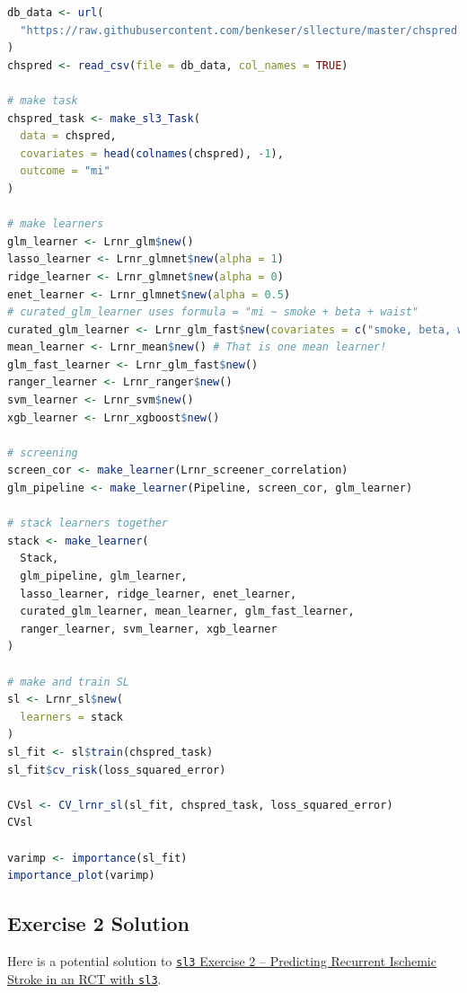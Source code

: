 \documentclass[
  12pt, krantz2,
]{krantz}
\newcommand{\passthrough}[1]{#1}
\newcommand{\1}{\mathbbm{1}}
\theoremstyle{definition}
\theoremstyle{definition}
\theoremstyle{definition}
\theoremstyle{definition}
\theoremstyle{remark}
\begin{document}
\begin{lstlisting}[language=R]
db_data <- url(
  "https://raw.githubusercontent.com/benkeser/sllecture/master/chspred.csv"
)
chspred <- read_csv(file = db_data, col_names = TRUE)

# make task
chspred_task <- make_sl3_Task(
  data = chspred,
  covariates = head(colnames(chspred), -1),
  outcome = "mi"
)

# make learners
glm_learner <- Lrnr_glm$new()
lasso_learner <- Lrnr_glmnet$new(alpha = 1)
ridge_learner <- Lrnr_glmnet$new(alpha = 0)
enet_learner <- Lrnr_glmnet$new(alpha = 0.5)
# curated_glm_learner uses formula = "mi ~ smoke + beta + waist"
curated_glm_learner <- Lrnr_glm_fast$new(covariates = c("smoke, beta, waist"))
mean_learner <- Lrnr_mean$new() # That is one mean learner!
glm_fast_learner <- Lrnr_glm_fast$new()
ranger_learner <- Lrnr_ranger$new()
svm_learner <- Lrnr_svm$new()
xgb_learner <- Lrnr_xgboost$new()

# screening
screen_cor <- make_learner(Lrnr_screener_correlation)
glm_pipeline <- make_learner(Pipeline, screen_cor, glm_learner)

# stack learners together
stack <- make_learner(
  Stack,
  glm_pipeline, glm_learner,
  lasso_learner, ridge_learner, enet_learner,
  curated_glm_learner, mean_learner, glm_fast_learner,
  ranger_learner, svm_learner, xgb_learner
)

# make and train SL
sl <- Lrnr_sl$new(
  learners = stack
)
sl_fit <- sl$train(chspred_task)
sl_fit$cv_risk(loss_squared_error)

CVsl <- CV_lrnr_sl(sl_fit, chspred_task, loss_squared_error)
CVsl

varimp <- importance(sl_fit)
importance_plot(varimp) 
\end{lstlisting}

\hypertarget{sl3ex2-sol}{%
\subsection{Exercise 2 Solution}\label{sl3ex2-sol}}

Here is a potential solution to \protect\hyperlink{sl3ex2}{\passthrough{\lstinline!sl3!} Exercise 2 -- Predicting Recurrent
Ischemic Stroke in an RCT with \passthrough{\lstinline!sl3!}}.
\end{document}
